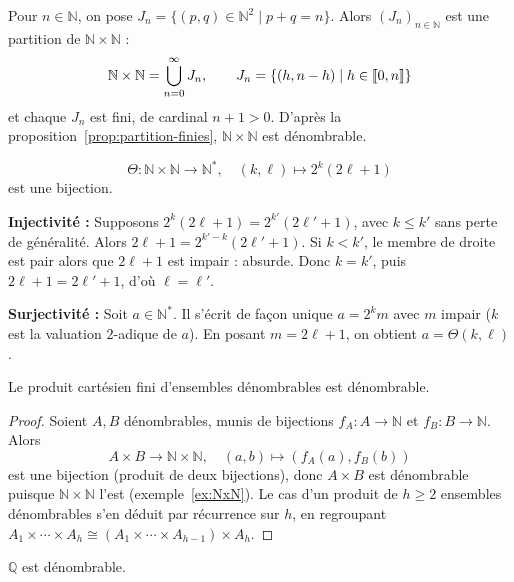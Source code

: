 \begin{exemple}
\label{ex:NxN}
Pour $n\in\mathbb{N}$, on pose $J_n=\{(p,q)\in\mathbb{N}^2 \mid p+q=n\}$. Alors $(J_n)_{n\in\mathbb{N}}$ est une partition de $\mathbb{N}\times\mathbb{N}$ :
\[\mathbb{N}\times\mathbb{N} = \bigcup_{n=0}^{\infty} J_n, \qquad J_n = \{(h,n-h) \mid h\in\llbracket 0,n \rrbracket\}\]
et chaque $J_n$ est fini, de cardinal $n+1>0$. D'après la proposition~\ref{prop:partition-finies}, $\mathbb{N}\times\mathbb{N}$ est dénombrable.
\end{exemple}

\begin{exemple}
\label{ex:theta}
\[\Theta : \mathbb{N}\times\mathbb{N} \to \mathbb{N}^*, \quad (k,\ell) \mapsto 2^k(2\ell+1)\]
est une bijection.

\textbf{Injectivité :} Supposons $2^k(2\ell+1) = 2^{k'}(2\ell'+1)$, avec $k\leq k'$ sans perte de généralité. Alors $2\ell+1 = 2^{k'-k}(2\ell'+1)$. Si $k<k'$, le membre de droite est pair alors que $2\ell+1$ est impair : absurde. Donc $k=k'$, puis $2\ell+1=2\ell'+1$, d'où $\ell=\ell'$.

\textbf{Surjectivité :} Soit $a\in\mathbb{N}^*$. Il s'écrit de façon unique $a=2^k m$ avec $m$ impair ($k$ est la valuation $2$-adique de $a$). En posant $m=2\ell+1$, on obtient $a=\Theta(k,\ell)$.
\end{exemple}

\begin{prop}
\label{prop:produit-denombrable}
Le produit cartésien fini d'ensembles dénombrables est dénombrable.
\end{prop}

\begin{proof}
Soient $A,B$ dénombrables, munis de bijections $f_A:A\to\mathbb{N}$ et $f_B:B\to\mathbb{N}$. Alors
\[A\times B \to \mathbb{N}\times\mathbb{N}, \quad (a,b)\mapsto (f_A(a),f_B(b))\]
est une bijection (produit de deux bijections), donc $A\times B$ est dénombrable puisque $\mathbb{N}\times\mathbb{N}$ l'est (exemple~\ref{ex:NxN}). Le cas d'un produit de $h\geq 2$ ensembles dénombrables s'en déduit par récurrence sur $h$, en regroupant $A_1\times\cdots\times A_h \cong (A_1\times\cdots\times A_{h-1})\times A_h$.
\end{proof}

\begin{prop}
$\mathbb{Q}$ est dénombrable.
\end{prop}

